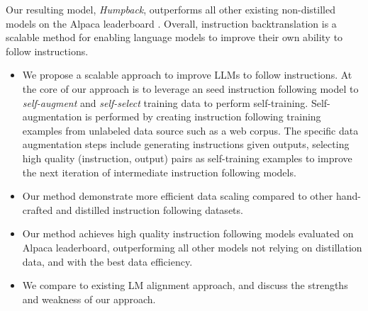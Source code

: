 Our resulting model, {\em Humpback}, outperforms
all other existing non-distilled models on the Alpaca leaderboard \citep{alpaca_eval}. 
Overall, instruction backtranslation is a scalable method for enabling language models to improve their own ability to follow instructions.



\begin{itemize}
\item We propose a scalable approach to improve LLMs to follow instructions. At the core of our approach is to leverage an seed instruction following model to \textit{self-augment} and \textit{self-select} training data to perform self-training. Self-augmentation is performed by creating instruction following training examples from unlabeled data source such as a web corpus. The specific data augmentation steps include generating instructions given outputs, selecting high quality (instruction, output) pairs as self-training examples to improve the next iteration of intermediate instruction following models.


\item Our method demonstrate more efficient data scaling compared to other hand-crafted and distilled instruction following datasets.

\item Our method achieves high quality instruction following models evaluated on Alpaca leaderboard, outperforming all other models not relying on distillation data, and with the best data efficiency. 

\item We compare to existing LM alignment approach, and discuss the strengths and weakness of our approach.
\end{itemize}
\fi 